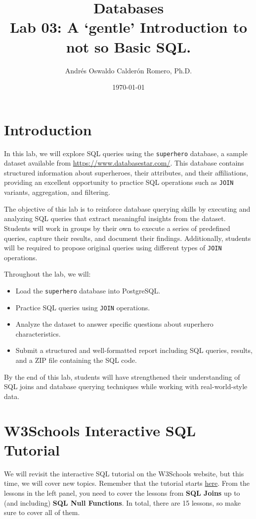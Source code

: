 \documentclass{article}
\title{Databases \\ Lab 03: A `gentle' Introduction to not so Basic SQL.}
\author{Andrés Oswaldo Calderón Romero, Ph.D.}
\date{\today}
\begin{document}
\maketitle

\section{Introduction}

In this lab, we will explore SQL queries using the \texttt{superhero} database, a sample dataset available from \url{https://www.databasestar.com/}. This database contains structured information about superheroes, their attributes, and their affiliations, providing an excellent opportunity to practice SQL operations such as \texttt{JOIN} variants, aggregation, and filtering.

The objective of this lab is to reinforce database querying skills by executing and analyzing SQL queries that extract meaningful insights from the dataset. Students will work in groups by their own to execute a series of predefined queries, capture their results, and document their findings. Additionally, students will be required to propose original queries using different types of \texttt{JOIN} operations.

Throughout the lab, we will:
\begin{itemize}
    \item Load the \texttt{superhero} database into PostgreSQL.
    \item Practice SQL queries using \texttt{JOIN} operations.
    \item Analyze the dataset to answer specific questions about superhero characteristics.
    \item Submit a structured and well-formatted report including SQL queries, results, and a ZIP file containing the SQL code.
\end{itemize}

By the end of this lab, students will have strengthened their understanding of SQL joins and database querying techniques while working with real-world-style data.

\section{W3Schools Interactive SQL Tutorial}

We will revisit the interactive SQL tutorial on the W3Schools website, but this time, we will cover new topics. Remember that the tutorial starts \href{https://www.w3schools.com/sql/}{here}. From the lessons in the left panel, you need to cover the lessons from \textbf{SQL Joins} up to (and including) \textbf{SQL Null Functions}. In total, there are 15 lessons, so make sure to cover all of them.
\end{document}
